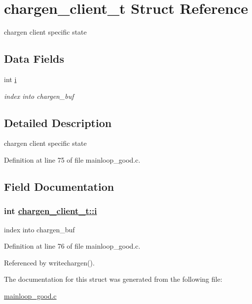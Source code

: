 \hypertarget{structchargen__client__t}{
\section{chargen\_\-client\_\-t Struct Reference}
\label{structchargen__client__t}
}
chargen client specific state  


\subsection*{Data Fields}
\begin{CompactItemize}
\item 
int \hyperlink{structchargen__client__t_o0}{i}
\begin{CompactList}\small\item\em index into chargen\_\-buf \item\end{CompactList}\end{CompactItemize}


\subsection{Detailed Description}
chargen client specific state 



Definition at line 75 of file mainloop\_\-good.c.

\subsection{Field Documentation}
\hypertarget{structchargen__client__t_o0}{
\subsubsection[i]{\setlength{\rightskip}{0pt plus 5cm}int \hyperlink{structchargen__client__t_o0}{chargen\_\-client\_\-t::i}}}
\label{structchargen__client__t_o0}


index into chargen\_\-buf 



Definition at line 76 of file mainloop\_\-good.c.

Referenced by writechargen().

The documentation for this struct was generated from the following file:\begin{CompactItemize}
\item 
\hyperlink{mainloop__good_8c}{mainloop\_\-good.c}\end{CompactItemize}
